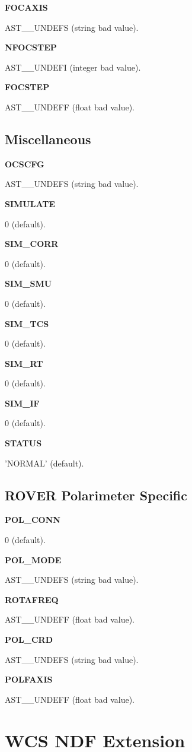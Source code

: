 \documentclass[twoside,11pt,nolof]{starlink}
\begin{document}
\textbf{FOCAXIS}

AST\_\_UNDEFS (string bad value).

\textbf{NFOCSTEP}

AST\_\_UNDEFI (integer bad value).

\textbf{FOCSTEP}

AST\_\_UNDEFF (float bad value).

\subsection{Miscellaneous}

\textbf{OCSCFG}

AST\_\_UNDEFS (string bad value).

\textbf{SIMULATE}

0 (default).

\textbf{SIM\_CORR}

0 (default).

\textbf{SIM\_SMU}

0 (default).

\textbf{SIM\_TCS}

0 (default).

\textbf{SIM\_RT}

0 (default).

\textbf{SIM\_IF}

0 (default).

\textbf{STATUS}

'NORMAL' (default).

\subsection{ROVER Polarimeter Specific}

\textbf{POL\_CONN}

0 (default).

\textbf{POL\_MODE}

AST\_\_UNDEFS (string bad value).

\textbf{ROTAFREQ}

AST\_\_UNDEFF (float bad value).

\textbf{POL\_CRD}

AST\_\_UNDEFS (string bad value).

\textbf{POLFAXIS}

AST\_\_UNDEFF (float bad value).

\section{WCS NDF Extension}
\end{document}
